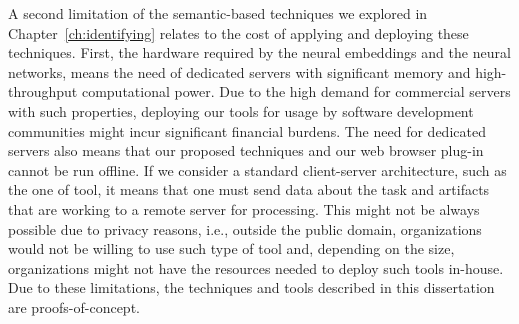 A second limitation of the semantic-based techniques we explored in Chapter~\ref{ch:identifying}
relates to the cost of applying and deploying these techniques. 
First, the hardware required by 
the neural embeddings and the neural networks, 
means the need of dedicated servers with significant 
memory and high-throughput computational power. Due to the high demand for commercial servers with such properties, deploying our tools for usage by software development communities might incur significant financial burdens. 
The need for dedicated servers also means that our proposed techniques and our web browser plug-in cannot be run offline. If we consider a standard client-server architecture, such as the one of \acs{tool}, it means that one must send data about the task and artifacts that are working to a remote server for processing. This might not be always possible due to privacy reasons, i.e., outside the public domain, organizations would not be willing to use such type of tool and, depending on the size,  organizations might not have the resources needed to deploy such tools in-house. Due to these limitations, the techniques and tools described in this dissertation are proofs-of-concept.











